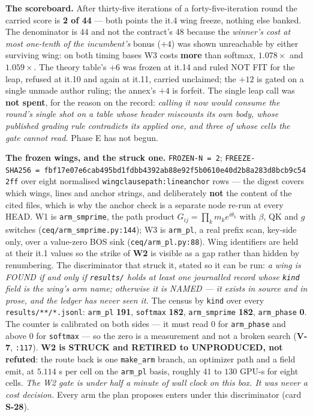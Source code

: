 \documentclass[11pt,a4paper]{article}
\theoremstyle{plain}
\theoremstyle{definition}
\theoremstyle{remark}
\begin{document}
\textbf{The scoreboard.} After thirty-five iterations of a
forty-five-iteration round the carried score is \textbf{2 of 44} ---
both points the it.4 wing freeze, nothing else banked. The denominator
is 44 and not the contract's 48 because the \emph{winner's cost at most
one-tenth of the incumbent's} bonus (\(+4\)) was shown unreachable by
either surviving wing: on both timing bases W3 costs \textbf{more} than
softmax, \(1.078\times\) and \(1.059\times\). The theory table's \(+6\)
was frozen at it.14 and ruled NOT FIT for the leap, refused at it.10 and
again at it.11, carried unclaimed; the \(+12\) is gated on a single
unmade author ruling; the annex's \(+4\) is forfeit. The single leap
call was \textbf{not spent}, for the reason on the record: \emph{calling
it now would consume the round's single shot on a table whose header
miscounts its own body, whose published grading rule contradicts its
applied one, and three of whose cells the gate cannot read.} Phase E has
not begun.

\textbf{The frozen wings, and the struck one.} \texttt{FROZEN-N\ =\ 2};
\texttt{FREEZE-SHA256\ =\ fbf17e07e6cab495bd1fdbb4392ab88e92f5b0610e40d2b8a283d8bcb9c542ff}
over eight normalised
\texttt{wing\textbar{}clause\textbar{}path:line\textbar{}anchor} rows
--- the digest covers which wings, lines and anchor strings, and
deliberately \textbf{not} the content of the cited files, which is why
the anchor check is a separate node re-run at every HEAD. W1 is
\texttt{arm\_smprime}, the path product
\(G_{ij}=\prod_k m_k e^{i\theta_k}\) with \(\beta\), QK and \(g\)
switches (\texttt{ceq/arm\_smprime.py:144}); W3 is \texttt{arm\_pl}, a
real prefix scan, key-side only, over a value-zero BOS sink
(\texttt{ceq/arm\_pl.py:88}). Wing identifiers are held at their it.1
values so the strike of \textbf{W2} is visible as a gap rather than
hidden by renumbering. The discriminator that struck it, stated so it
can be run: \emph{a wing is FOUND if and only if \texttt{results/} holds
at least one journalled record whose \texttt{kind} field is the wing's
arm name; otherwise it is NAMED --- it exists in source and in prose,
and the ledger has never seen it.} The census by \texttt{kind} over
every \texttt{results/**/*.jsonl}: \texttt{arm\_pl} \textbf{191},
\texttt{softmax} \textbf{182}, \texttt{arm\_smprime} \textbf{182},
\texttt{arm\_phase} \textbf{0}. The counter is calibrated on both sides
--- it must read \(0\) for \texttt{arm\_phase} and above \(0\) for
\texttt{softmax} --- so the zero is a measurement and not a broken
search (\textbf{V-7}, \texttt{:117}). \textbf{W2 is STRUCK and RETIRED
to UNPRODUCED, not refuted}: the route back is one \texttt{make\_arm}
branch, an optimizer path and a field emit, at \(5.114\) s per cell on
the \texttt{arm\_pl} basis, roughly \(41\) to \(130\) GPU-s for eight
cells. \emph{The W2 gate is under half a minute of wall clock on this
box. It was never a cost decision.} Every arm the plan proposes enters
under this discriminator (card \textbf{S-28}).
\end{document}
